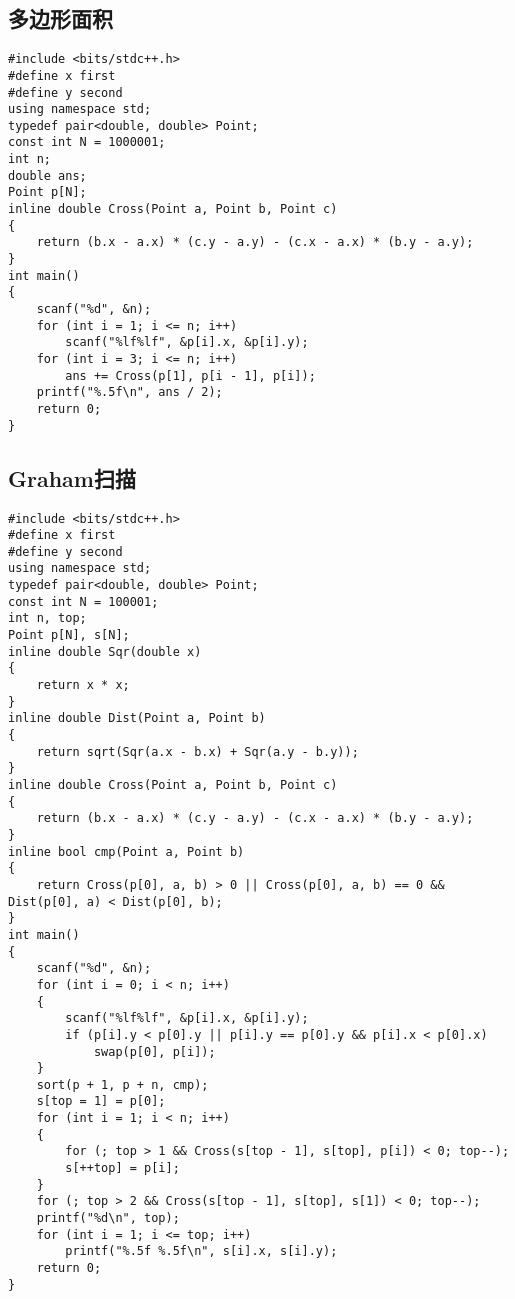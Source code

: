 \documentclass[a4paper]{article}
\begin{document}
\subsection{多边形面积}
\begin{lstlisting}
#include <bits/stdc++.h>
#define x first
#define y second
using namespace std;
typedef pair<double, double> Point;
const int N = 1000001;
int n;
double ans;
Point p[N];
inline double Cross(Point a, Point b, Point c)
{
    return (b.x - a.x) * (c.y - a.y) - (c.x - a.x) * (b.y - a.y);
}
int main()
{
    scanf("%d", &n);
    for (int i = 1; i <= n; i++)
        scanf("%lf%lf", &p[i].x, &p[i].y);
    for (int i = 3; i <= n; i++)
        ans += Cross(p[1], p[i - 1], p[i]);
    printf("%.5f\n", ans / 2);
    return 0;
}
\end{lstlisting}
\subsection{Graham扫描}
\begin{lstlisting}
#include <bits/stdc++.h>
#define x first
#define y second
using namespace std;
typedef pair<double, double> Point;
const int N = 100001;
int n, top;
Point p[N], s[N];
inline double Sqr(double x)
{
    return x * x;
}
inline double Dist(Point a, Point b)
{
    return sqrt(Sqr(a.x - b.x) + Sqr(a.y - b.y));
}
inline double Cross(Point a, Point b, Point c)
{
    return (b.x - a.x) * (c.y - a.y) - (c.x - a.x) * (b.y - a.y);
}
inline bool cmp(Point a, Point b)
{
    return Cross(p[0], a, b) > 0 || Cross(p[0], a, b) == 0 && Dist(p[0], a) < Dist(p[0], b);
}
int main()
{
    scanf("%d", &n);
    for (int i = 0; i < n; i++)
    {
        scanf("%lf%lf", &p[i].x, &p[i].y);
        if (p[i].y < p[0].y || p[i].y == p[0].y && p[i].x < p[0].x)
            swap(p[0], p[i]);
    }
    sort(p + 1, p + n, cmp);
    s[top = 1] = p[0];
    for (int i = 1; i < n; i++)
    {
        for (; top > 1 && Cross(s[top - 1], s[top], p[i]) < 0; top--);
        s[++top] = p[i];
    }
    for (; top > 2 && Cross(s[top - 1], s[top], s[1]) < 0; top--);
    printf("%d\n", top);
    for (int i = 1; i <= top; i++)
        printf("%.5f %.5f\n", s[i].x, s[i].y);
    return 0;
}
\end{lstlisting}
\end{document}
